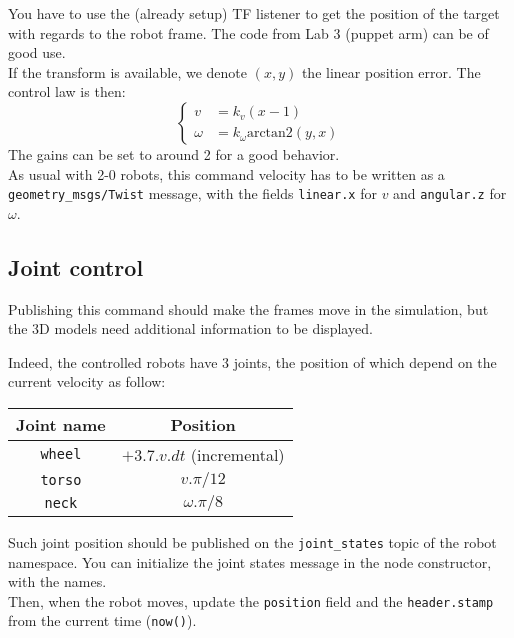 \documentclass{ecnreport}
\begin{document}
You have to use the (already setup) TF listener to get the position of the target with regards to the robot frame. The code from Lab 3 (puppet arm) can be of good use.\\

If the transform is available, we denote $(x,y)$ the linear position error. The control law is then:
\begin{equation*}
   \left\{\begin{array}{ll}
          v &= k_v(x-1) \\
          \omega &= k_\omega \text{arctan2}(y, x)
         \end{array}\right.
\end{equation*}
The gains can be set to around 2 for a good behavior.\\

As usual with 2-0 robots, this command velocity has to be written as a \texttt{geometry\_msgs/Twist} message, with the fields \texttt{linear.x} for $v$ and \texttt{angular.z} for $\omega$. 


\subsection{Joint control}

Publishing this command should make the frames move in the simulation, but the 3D models need additional information to be displayed.

Indeed, the controlled robots have 3 joints, the position of which depend on the current velocity as follow:

\begin{center}
 \begin{tabular}{|c|c|}\hline
  Joint name & Position \\\hline
  \texttt{wheel} & $+3.7.v.dt$ (incremental) \\\hline
  \texttt{torso} & $v.\pi/12$\\\hline
  \texttt{neck} & $\omega.\pi/8$\\\hline
 \end{tabular}
\end{center}

Such joint position should be published on the \texttt{joint\_states} topic of the robot namespace. You can initialize the joint states message in the node constructor, with the names.\\

Then, when the robot moves, update the \texttt{position} field and the \texttt{header.stamp} from the current time (\texttt{now()}).\\
\end{document}
